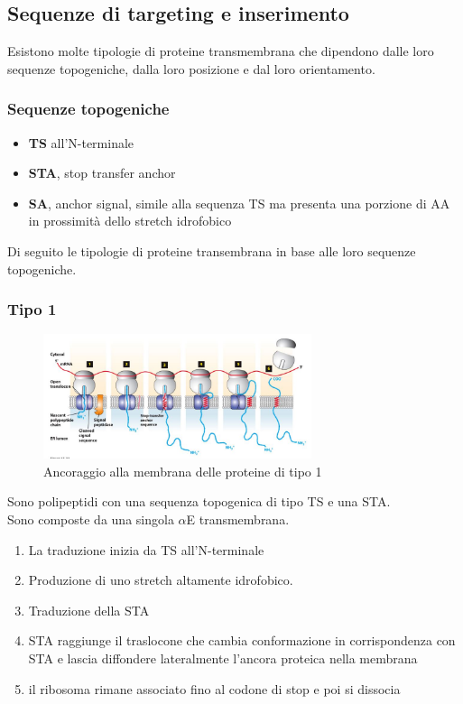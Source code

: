     \subsection{Sequenze di targeting e inserimento}
        Esistono molte tipologie di proteine transmembrana che dipendono dalle loro sequenze topogeniche, dalla loro posizione e dal loro orientamento. 
        \subsubsection{Sequenze topogeniche}
            \begin{itemize}
                \item \textbf{TS} all'N-terminale
                \item \textbf{STA}, stop transfer anchor
                \item \textbf{SA}, anchor signal, simile alla sequenza TS ma presenta una porzione di AA in prossimità dello stretch idrofobico
            \end{itemize}
            Di seguito le tipologie di proteine transembrana in base alle loro sequenze topogeniche.
        
        \subsubsection{Tipo 1}
            \begin{figure}[h]
                \centering
                \includegraphics[width=0.7\textwidth]{images/Tipo1.JPG}
                \caption{\small Ancoraggio alla membrana delle proteine di tipo 1}
                \label{fig:mesh1}
            \end{figure}
            Sono polipeptidi con una sequenza topogenica di tipo TS e una STA.\\
            Sono composte da una singola $\alpha$E transmembrana. \\
            \begin{enumerate}
                \item La traduzione inizia da TS all'N-terminale
                \item Produzione di uno stretch altamente idrofobico.
                \item Traduzione della STA
                \item STA raggiunge il traslocone che cambia conformazione in corrispondenza con STA e lascia diffondere lateralmente l'ancora proteica nella membrana
                \item il ribosoma rimane associato fino al codone di stop e poi si dissocia
            \end{enumerate}
            
